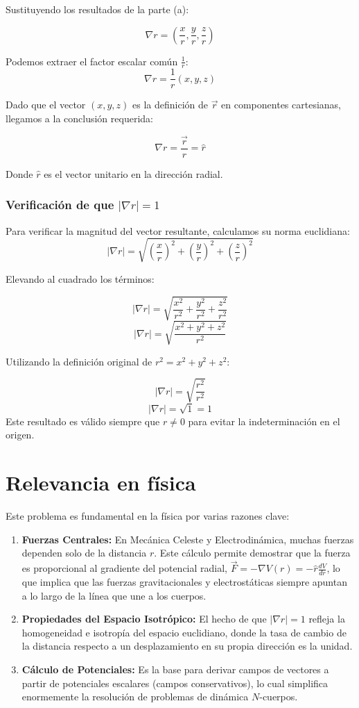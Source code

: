 \documentclass[a4paper]{article}
\begin{document}
Sustituyendo los resultados de la parte (a):

$$ \nabla r = \left( \frac{x}{r}, \frac{y}{r}, \frac{z}{r} \right) $$

Podemos extraer el factor escalar común $\frac{1}{r}$:
$$ \nabla r = \frac{1}{r} (x, y, z) $$

Dado que el vector $(x, y, z)$ es la definición de $\vec{r}$ en componentes cartesianas, llegamos a la conclusión requerida:

$$ \nabla r = \frac{\vec{r}}{r} = \hat{r} $$

Donde $\hat{r}$ es el vector unitario en la dirección radial.

\subsubsection{Verificación de que $|\nabla r| = 1$}
Para verificar la magnitud del vector resultante, calculamos su norma euclidiana:
$$ |\nabla r| = \sqrt{ \left( \frac{x}{r} \right)^2 + \left( \frac{y}{r} \right)^2 + \left( \frac{z}{r} \right)^2 } $$

Elevando al cuadrado los términos:

$$ |\nabla r| = \sqrt{ \frac{x^2}{r^2} + \frac{y^2}{r^2} + \frac{z^2}{r^2} } $$
$$|\nabla r| = \sqrt{ \frac{x^2 + y^2 + z^2}{r^2} } $$

Utilizando la definición original de $r^2 = x^2 + y^2 + z^2$:

$$ |\nabla r| = \sqrt{ \frac{r^2}{r^2} } $$
$$ |\nabla r| = \sqrt{1} = 1 $$
Este resultado es válido siempre que $r \neq 0$ para evitar la indeterminación en el origen.

\section*{Relevancia en física}

Este problema es fundamental en la física por varias razones clave:

\begin{enumerate}
    \item \textbf{Fuerzas Centrales:} En Mecánica Celeste y Electrodinámica, muchas fuerzas dependen solo de la distancia $r$. Este cálculo permite demostrar que la fuerza es proporcional al gradiente del potencial radial, $\vec{F} = -\nabla V(r) = -\hat{r} \frac{dV}{dr}$, lo que implica que las fuerzas gravitacionales y electrostáticas siempre apuntan a lo largo de la línea que une a los cuerpos.
    \item \textbf{Propiedades del Espacio Isotrópico:} El hecho de que $|\nabla r| = 1$ refleja la homogeneidad e isotropía del espacio euclidiano, donde la tasa de cambio de la distancia respecto a un desplazamiento en su propia dirección es la unidad.
    \item \textbf{Cálculo de Potenciales:} Es la base para derivar campos de vectores a partir de potenciales escalares (campos conservativos), lo cual simplifica enormemente la resolución de problemas de dinámica $N$-cuerpos.
\end{enumerate}
\end{document}
